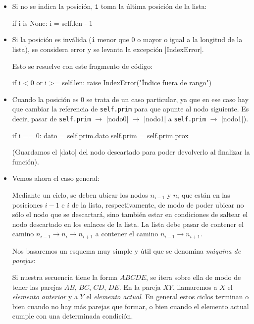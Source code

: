 \begin{itemize}

\item Si no se indica la posición, \lstinline!i! toma la última posición de la
lista:

\begin{codigo-python-sn}
if i is None:
    i = self.len - 1
\end{codigo-python-sn}

\item Si la posición es inválida (\lstinline!i! menor que $0$ o mayor o
igual a la longitud de la lista), se considera error y se levanta la
excepción |IndexError|.

Esto se resuelve con este fragmento de código:

\begin{codigo-python-sn}
if i < 0 or i >= self.len:
    raise IndexError("Índice fuera de rango")
\end{codigo-python-sn}

\item Cuando la posición es $0$ se trata de un caso particular, ya que en ese
caso hay que cambiar la referencia de
\lstinline!self.prim! para que apunte al nodo siguiente.  Es decir, pasar de
\lstinline!self.prim! $\rightarrow$ |nodo0| $\rightarrow$ |nodo1| a
\lstinline!self.prim! $\rightarrow$ |nodo1|).

\begin{codigo-python-sn}
if i == 0:
    dato = self.prim.dato
    self.prim = self.prim.prox
\end{codigo-python-sn}

\noindent (Guardamos el |dato| del nodo descartado para poder devolverlo al
finalizar la función).

\item Vemos ahora el caso general:

Mediante un ciclo, se deben ubicar los nodos $n_{i - 1}$ y $n_i$ que
están en las posiciones $i-1$ e $i$ de la lista, respectivamente, de modo de
poder ubicar no sólo el nodo que se descartará, sino también estar en condiciones
de saltear el nodo descartado en los enlaces de la lista.  La lista debe pasar de
contener el camino $n_{i-1} \rightarrow n_i \rightarrow n_{i+1}$
a contener el camino $n_{i-1} \rightarrow n_{i+1}$.

Nos basaremos un esquema muy simple y útil que se denomina \emph{máquina de parejas}:

Si nuestra secuencia tiene la forma $ABCDE$, se itera sobre ella de modo de
tener las parejas $AB$, $BC$, $CD$, $DE$. En la pareja $XY$, llamaremos a $X$ el
\emph{elemento anterior}
y a $Y$ el \emph{elemento actual}. En general estos ciclos terminan o bien cuando
no hay más parejas que formar, o bien cuando el elemento actual cumple con una determinada
condición.


\end{itemize}
